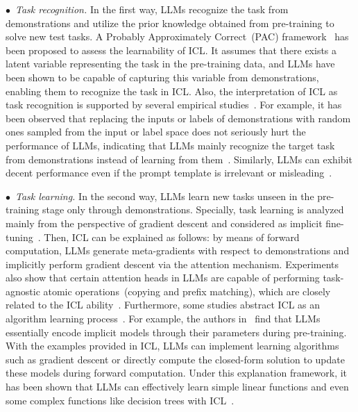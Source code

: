 $\bullet$~\emph{Task recognition.}
{In the first way, LLMs recognize the task from demonstrations and utilize the prior knowledge obtained from pre-training to solve new test tasks. 
A Probably Approximately Correct~(PAC) framework~\cite{Wies-2023-arXiv-the} has been proposed to assess the learnability of ICL.
It assumes that there exists a latent variable representing the task in the pre-training data, and LLMs have been shown to be capable of capturing this variable from demonstrations, enabling them to recognize the task in ICL.
Also, the interpretation of ICL as task recognition is  supported by several empirical studies~\cite{Min-EMNLP-2022-Rethinking, Webson-2022-NAACL-do}.
For example, it has been observed that replacing the inputs or labels of demonstrations with random ones sampled from the input or label space does not seriously hurt the performance of LLMs, indicating that LLMs mainly recognize the target task from demonstrations instead of learning from them~\cite{Min-EMNLP-2022-Rethinking, Pan-2023-arXiv-what}.
Similarly, LLMs can exhibit decent performance even if the prompt template is irrelevant or misleading~\cite{Webson-2022-NAACL-do}.}

$\bullet$~\emph{Task learning.}
{In the second way, LLMs learn new tasks unseen in the pre-training stage only through demonstrations.
Specially, task learning is   analyzed mainly from the perspective of gradient descent and considered as implicit fine-tuning~\cite{Oswald-arxiv-2022-Transformers, Dai-arxiv-2022-Why}.}
Then, ICL can be explained as follows: by means of forward computation, LLMs generate meta-gradients with respect to demonstrations and implicitly perform gradient descent via the attention mechanism.
Experiments also show that certain attention heads in LLMs are capable of performing task-agnostic atomic operations~(\eg copying and prefix matching), which are closely related to the ICL ability~\cite{Olsson-arxiv-2022-In}.
Furthermore, some studies abstract ICL as an algorithm learning process~\cite{rek-arxiv-2022-what}. 
For example, the authors in~\cite{rek-arxiv-2022-what} find that LLMs essentially encode implicit models through their parameters during pre-training.
With the examples provided in ICL, LLMs can implement learning algorithms such as gradient descent or directly compute the closed-form solution to update these models during forward computation.
Under this explanation framework, it has been shown that LLMs can effectively learn simple linear functions and even some complex functions like decision trees with ICL~\cite{rek-arxiv-2022-what}.

